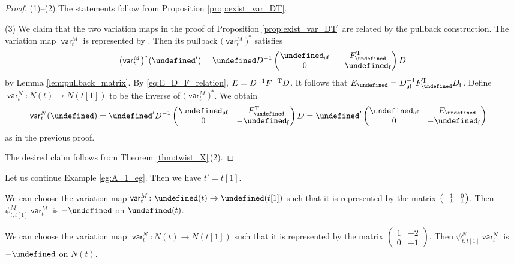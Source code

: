 \documentclass[10pt,a4paper]{amsart}
\newcommand{\opname}[1]{\operatorname{\mathsf{#1}}}
\newcommand{\var}{\opname{var}}
\newcommand{\fv}{\opname{f}}
\newcommand{\ufv}{\opname{uf}}
\let\Mc\undefined
\let\Id\undefined
\let\ee\undefined
\let\uee\undefined
\let\high\undefined
\let\low\undefined
\newcommand{\Mc}{M^\circ}
\newcommand{\Id}{{\opname{Id}}}
\newcommand{\ee}{\mathbf{e}}
\newcommand{\uee}{\underline{\ee}}
\newcommand{\high}{\opname{\ufv,\fv}}
\newcommand{\low}{\opname{\fv,\ufv}}
\numberwithin{equation}{section}
\begin{document}
\begin{proof}
(1)--(2) The statements follow from Proposition \ref{prop:exist_var_DT}.

(3) We claim that the two variation maps in the proof of Proposition
\ref{prop:exist_var_DT} are related by the pullback construction.
The variation map $\var_{t}^{M}$ is represented by \smash{$\left(\begin{smallmatrix}
\Id_{\ufv} & 0\\
-F_{\low} & -\Id_{\fv}
\end{smallmatrix}\right)$}. Then its pullback $\bigl(\var_{t}^{M}\bigr)^{*}$ satisfies \[\bigl(\var_{t}^{M}\bigr)^{*}(\uee')=\uee D^{-1}\begin{pmatrix}
\Id_{\ufv} & -F_{\low}^{\rm T}\\
0 & -\Id_{\fv}
\end{pmatrix}D\] by Lemma \ref{lem:pullback_matrix}. By \eqref{eq:E_D_F_relation},
$E=D^{-1}F^{\rm -T}D$. It follows that $E_{\high}=D_{\ufv}^{-1}F_{\low}^{\rm T}D_{\fv}$.
Define $\var_{t}^{N}\colon N(t)\rightarrow N(t[1])$ to be the inverse of
$\bigl(\var_{t}^{M}\bigr)^{*}$. We obtain
\begin{align*}
\var_{t}^{N}(\uee) & =\uee'D^{-1}\begin{pmatrix}
\Id_{\ufv} & -F_{\low}^{\rm T}\\
0 & -\Id_{\fv}
\end{pmatrix}D =\uee'\begin{pmatrix}
\Id_{\ufv} & -E_{\high}\\
0 & -\Id_{\fv}
\end{pmatrix}
\end{align*}
as in the previous proof.

The desired claim follows from Theorem \ref{thm:twist_X}\,(2).
\end{proof}

\begin{Example}\label{eg:A_1_variation_map}
Let us continue Example \ref{eg:A_1_eg}. Then we have $t'=t[1]$.

We can choose the variation map $\var_{t}^{M}\colon\Mc(t)\rightarrow\Mc(t[1])$
such that it is represented by the matrix $\left(\begin{smallmatrix}
\hphantom{-}1 & \hphantom{-}0\\
-1 & -1
\end{smallmatrix}\right)$. Then $\psi_{t,t[1]}^{M}\var_{t}^{M}$ is $-\Id$ on $\Mc(t)$.

We can choose the variation map $\var_{t}^{N}\colon N(t)\rightarrow N(t[1])$
such that it is represented by the matrix $\left(\begin{smallmatrix}
1 & -2\\
0 & -1
\end{smallmatrix}\right)$. Then $\psi_{t,t[1]}^{N}\var_{t}^{N}$ is $-\Id$ on $N(t)$.

\end{Example}
\end{document}
